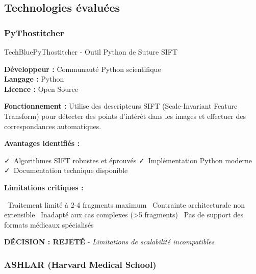 \documentclass[11pt,a4paper]{report}
\newcommand{\pro}[1]{\textcolor{SuccessGreen}{\faCheck\ #1}}
\newcommand{\con}[1]{\textcolor{DangerRed}{\faTimes\ #1}}
\begin{document}
\subsection{Technologies évaluées}

\subsubsection{PyThostitcher}

\begin{techbox}{TechBlue}{PyThostitcher - Outil Python de Suture SIFT}

\textbf{Développeur :} Communauté Python scientifique \\
\textbf{Langage :} Python \\
\textbf{Licence :} Open Source

\vspace{0.5cm}

\textbf{Fonctionnement :} Utilise des descripteurs SIFT (Scale-Invariant Feature Transform) pour détecter des points d'intérêt dans les images et effectuer des correspondances automatiques.

\textbf{Avantages identifiés :}
\begin{itemize}[leftmargin=*]
    \pro{Algorithmes SIFT robustes et éprouvés}
    \pro{Implémentation Python moderne}
    \pro{Documentation technique disponible}
\end{itemize}

\textbf{Limitations critiques :}
\begin{itemize}[leftmargin=*]
    \con{Traitement limité à 2-4 fragments maximum}
    \con{Contrainte architecturale non extensible}
    \con{Inadapté aux cas complexes (>5 fragments)}
    \con{Pas de support des formats médicaux spécialisés}
\end{itemize}

\begin{center}
\textbf{\textcolor{DangerRed}{DÉCISION : REJETÉ}} - \textit{Limitations de scalabilité incompatibles}
\end{center}

\end{techbox}

\subsubsection{ASHLAR (Harvard Medical School)}
\end{document}
